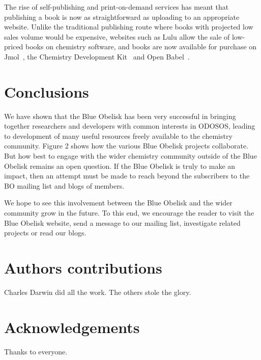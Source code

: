\documentclass[10pt]{bmc_article}
\newenvironment{bmcformat}{\fussy\setboolean{publ}{true}}{\fussy}
\begin{document}
\begin{bmcformat}
The rise of self-publishing and print-on-demand services has meant
that publishing a book is now as straightforward as uploading to an
appropriate website. Unlike the traditional publishing route where
books with projected low sales volume would be expensive,
websites such as Lulu\cite{WebLulu} allow the sale of low-priced books on
chemistry software, and books are now available for purchase
on Jmol~\cite{JmolBook}, the Chemistry Development Kit~\cite{CDKBook}
and Open Babel~\cite{OpenBabelBook}.

\section*{Conclusions}

We have shown that the Blue Obelisk has been very successful
in bringing together researchers and developers with common interests
in ODOSOS, leading to development of many useful resources freely
available to the chemistry community. Figure 2 shows how the various
Blue Obelisk projects collaborate. But how best to engage with the
wider chemistry community outside of the Blue Obelisk remains an open
question. If the Blue Obelisk is truly to make an impact,
then an attempt must be made to reach beyond the subscribers to the
BO mailing list and blogs of members.

We hope to see this involvement between the Blue Obelisk and the wider
community grow in the future. To this end, we encourage the reader to
visit the Blue Obelisk website\cite{WebBlueObelisk}, send a message to our mailing list,
investigate related projects or read our blogs.


\section*{Authors contributions}
   Charles Darwin did all the work. The others stole the glory.


\section*{Acknowledgements}
  Thanks to everyone.






\end{bmcformat}
\end{document}
